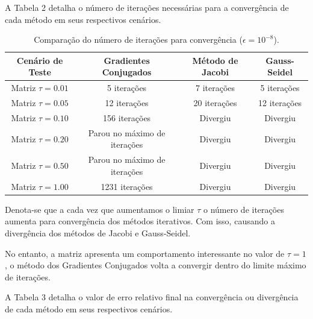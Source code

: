 \documentclass[12pt,a4paper]{article}
\begin{document}
A Tabela 2 detalha o número de iterações necessárias para a convergência de cada método em seus respectivos cenários.

\begin{table}[h!]
\centering
\caption{Comparação do número de iterações para convergência ($\epsilon = 10^{-8}$).}
\label{tab:comparacao_metodos}
\vspace{2mm}
\begin{tabular}{cccc}
\toprule
\textbf{Cenário de Teste} & \textbf{Gradientes Conjugados} & \textbf{Método de Jacobi} & \textbf{Gauss-Seidel} \\
\midrule
Matriz $\tau = 0.01$ & 5 iterações & 7 iterações & 5 iterações\\
Matriz $\tau = 0.05$ & 12 iterações & 20 iterações & 12 iterações \\
Matriz $\tau = 0.10$ & 156 iterações & Divergiu & Divergiu \\
Matriz $\tau = 0.20$ & Parou no máximo de iterações & Divergiu & Divergiu \\
Matriz $\tau = 0.50$ & Parou no máximo de iterações & Divergiu & Divergiu \\
Matriz $\tau = 1.00$ & 1231 iterações & Divergiu & Divergiu \\
\bottomrule
\end{tabular}
\end{table}

Denota-se que a cada vez que aumentamos o limiar $\tau$ o número de iterações aumenta para convergência dos métodos iterativos. Com isso, causando a divergência dos métodos de Jacobi e Gauss-Seidel. 

No entanto, a matriz apresenta um comportamento interessante no valor de $\tau = 1$, o método dos Gradientes Conjugados volta a convergir dentro do limite máximo de iterações.

A Tabela 3 detalha o valor de erro relativo final na convergência ou divergência de cada método em seus respectivos cenários.
\end{document}

